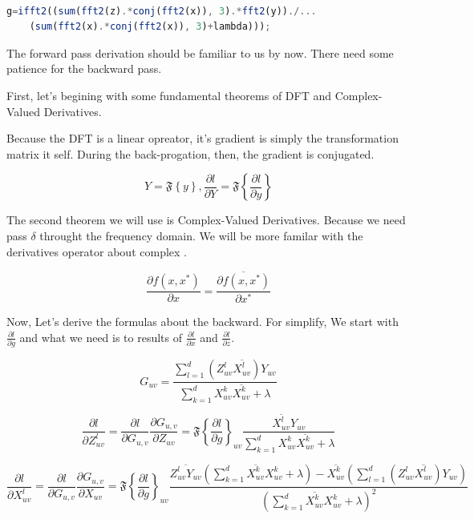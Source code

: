 \documentclass[11pt]{article}
\begin{document}
\begin{lstlisting}[language=Octave]

g=ifft2((sum(fft2(z).*conj(fft2(x)), 3).*fft2(y))./...
	(sum(fft2(x).*conj(fft2(x)), 3)+lambda)));

\end{lstlisting}

The forward pass derivation should be familiar to us by now. There need some 
patience for the backward pass.

First, let's begining with  some fundamental theorems of DFT and Complex-Valued Derivatives.

Because the DFT is a linear opreator, it's gradient is simply the transformation matrix it self. During the back-progation, then, the gradient is conjugated.\cite{SpectralPool}

$$
Y=\mathfrak{F}\left\{y\right\},\frac{\partial l}{\partial Y} = \mathfrak{F}\left\{\frac{\partial l}{\partial y}\right\}
$$


The second theorem we will use is Complex-Valued Derivatives\cite{Complexderivatives}. Because we need pass $\delta$ throught the frequency domain. We will be more familar with the derivatives operator about complex .

$$
\frac{\partial f(x,x^{*})}{\partial x}=\overline{\frac{\partial f(x,x^{*})}{\partial x^{*}}}
$$
 
Now, Let's derive the formulas about the backward. For simplify, We start with 
 $ \frac{\partial l}{\partial g} $ and what we need is to results of  $ \frac{\partial l}{\partial x} $ and $ \frac{\partial l}{\partial z} $.

$$
G_{uv}=\frac{\sum_{l=1}^{d}(Z_{uv}^{l}\overline{X_{uv}^{l}})Y_{uv}}{\sum_{k=1}^{d}X_{uv}^{k}\overline{X_{uv}^{k}}+\lambda}
$$

$$
\frac{\partial l}{\partial Z_{uv}^{l}}=\frac{\partial l}{\partial G_{u,v}}\frac{\partial G_{u,v}}{\partial Z_{uv}}=\mathfrak{F}\left\{\frac{\partial l}{\partial g}\right\}_{uv}  \frac{\overline{X_{uv}^{l}}Y_{uv}}{\sum_{k=1}^{d}X_{uv}^{k}\overline{X_{uv}^{k}}+\lambda}
$$

$$
\frac{\partial l}{\partial X_{uv}^{l}}
=\frac{\partial l}{\partial G_{u,v}}\frac{\partial G_{u,v}}{\partial X_{uv}}
=\mathfrak{F}\left\{\frac{\partial l}{\partial g}\right\}_{uv}
\frac{
\overline{Z_{uv}^{l}Y_{uv}}(\sum_{k=1}^{d}\overline{X_{uv}^{k}}X_{uv}^{k}+\lambda)-\overline{X_{uv}^{k}}(\sum_{l=1}^{d}(Z_{uv}^{l}\overline{X_{uv}^{l}})Y_{uv})}
{(\sum_{k=1}^{d}\overline{X_{uv}^{k}}X_{uv}^{k}+\lambda)^{2}}
$$
	
\end{document}
